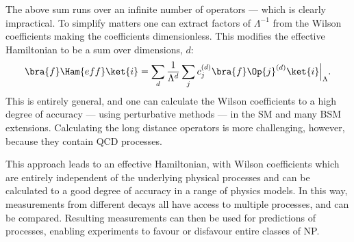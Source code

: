 The above sum runs over an infinite number of operators --- which is clearly impractical.
To simplify matters one can extract factors of $\Lambda^{-1}$ from the Wilson coefficients
making the coefficients dimensionless.
This modifies the effective Hamiltonian to be a sum over dimensions, $d$:
\begin{equation}
  \bra{f}\Ham{eff}\ket{i} =
  \sum_{d}\frac{1}{\Lambda^{d}}
  \sum_j c_j^{(d)}\bra{f}\Op{j}^{(d)}\ket{i}\Big|_{\Lambda}.
\end{equation}
This is entirely general, and one can calculate the Wilson coefficients to a high degree of
accuracy --- using perturbative methods --- in the SM and many BSM extensions.
Calculating the long distance operators is more challenging, however, because they contain QCD
processes.

This approach leads to an effective Hamiltonian, with Wilson coefficients which are entirely
independent of the underlying physical processes and can be calculated to a good degree of accuracy
in a range of physics models.
In this way, measurements from different decays all have access to multiple processes, and can be
compared.
Resulting measurements can then be used for predictions of processes, enabling experiments to
favour or disfavour entire classes of NP.






